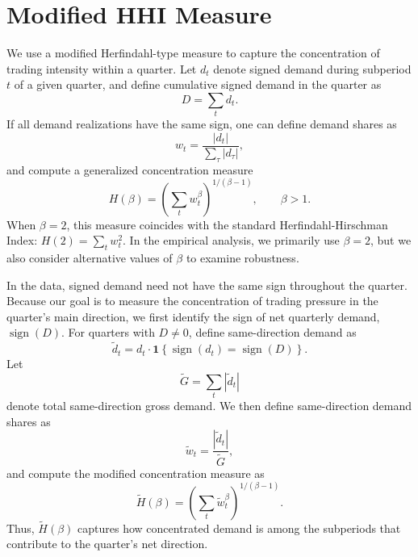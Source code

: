 \documentclass[pdftex,12pt,a4paper]{article}
\begin{document}
\title{}
\author{}
\date{\today}
\maketitle

\abstract \noindent 
\setlength{\parindent}{0pt}
\setlength{\parskip}{0.5\baselineskip}

\section{Modified HHI Measure}

We use a modified Herfindahl-type measure to capture the concentration of
trading intensity within a quarter. Let $d_t$ denote signed demand during
subperiod $t$ of a given quarter, and define cumulative signed demand in the
quarter as
\begin{equation}
    D = \sum_t d_t .
\end{equation}
If all demand realizations have the same sign, one can define demand shares as
\begin{equation}
    w_t = \frac{|d_t|}{\sum_\tau |d_\tau|},
\end{equation}
and compute a generalized concentration measure
\begin{equation}
    H(\beta)
    =
    \left( \sum_t w_t^\beta \right)^{1/(\beta-1)},
    \qquad \beta>1.
    \label{eq:hhi}
\end{equation}
When $\beta=2$, this measure coincides with the standard Herfindahl-Hirschman
Index: $H(2)=\sum_t w_t^2$. In the empirical analysis, we primarily use $\beta=2$, but we also consider alternative values of $\beta$ to examine robustness.

In the data, signed demand need not have the same sign throughout the quarter.
Because our goal is to measure the concentration of trading pressure in the
quarter's main direction, we first identify the sign of net quarterly demand,
$\operatorname{sign}(D)$. For quarters with $D\neq 0$, define same-direction
demand as
\begin{equation}
    \tilde d_t
    =
    d_t \cdot
    \mathbf{1}\left\{
    \operatorname{sign}(d_t)=\operatorname{sign}(D)
    \right\}.
\end{equation}
Let
\begin{equation}
    \tilde G
    =
    \sum_t |\tilde d_t|
\end{equation}
denote total same-direction gross demand. We then define same-direction demand
shares as
\begin{equation}
    \tilde w_t
    =
    \frac{|\tilde d_t|}{\tilde G},
\end{equation}
and compute the modified concentration measure as
\begin{equation}
    \tilde H(\beta)
    =
    \left( \sum_t \tilde w_t^\beta \right)^{1/(\beta-1)}.
    \label{eq:modified_hhi}
\end{equation}
Thus, $\tilde H(\beta)$ captures how concentrated demand is among the subperiods that contribute to the quarter's net direction. 
\end{document}
